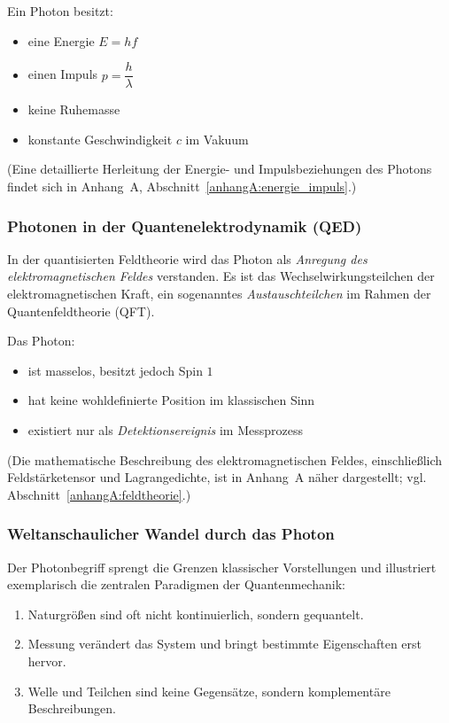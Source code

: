 Ein Photon besitzt:
\begin{itemize}
	\item eine Energie $E = h f$
	\item einen Impuls $p = \dfrac{h}{\lambda}$
	\item keine Ruhemasse
	\item konstante Geschwindigkeit $c$ im Vakuum
\end{itemize}
(Eine detaillierte Herleitung der Energie- und Impulsbeziehungen des Photons findet sich in Anhang~A, Abschnitt~\ref{anhangA:energie_impuls}.)
\subsubsection{Photonen in der Quantenelektrodynamik (QED)}

In der quantisierten Feldtheorie wird das Photon als \emph{Anregung des elektromagnetischen Feldes} verstanden. Es ist das Wechselwirkungsteilchen der elektromagnetischen Kraft, ein sogenanntes \emph{Austauschteilchen} im Rahmen der Quantenfeldtheorie (QFT).

Das Photon:
\begin{itemize}
	\item ist masselos, besitzt jedoch Spin $1$
	\item hat keine wohldefinierte Position im klassischen Sinn
	\item existiert nur als \emph{Detektionsereignis} im Messprozess
\end{itemize}
(Die mathematische Beschreibung des elektromagnetischen Feldes, einschließlich Feldstärketensor und Lagrangedichte, ist in Anhang~A näher dargestellt; vgl. Abschnitt~\ref{anhangA:feldtheorie}.)
\subsubsection{Weltanschaulicher Wandel durch das Photon}

Der Photonbegriff sprengt die Grenzen klassischer Vorstellungen und illustriert exemplarisch die zentralen Paradigmen der Quantenmechanik:
\begin{enumerate}
	\item Naturgrößen sind oft nicht kontinuierlich, sondern gequantelt.
	\item Messung verändert das System und bringt bestimmte Eigenschaften erst hervor.
	\item Welle und Teilchen sind keine Gegensätze, sondern komplementäre Beschreibungen.
\end{enumerate}

